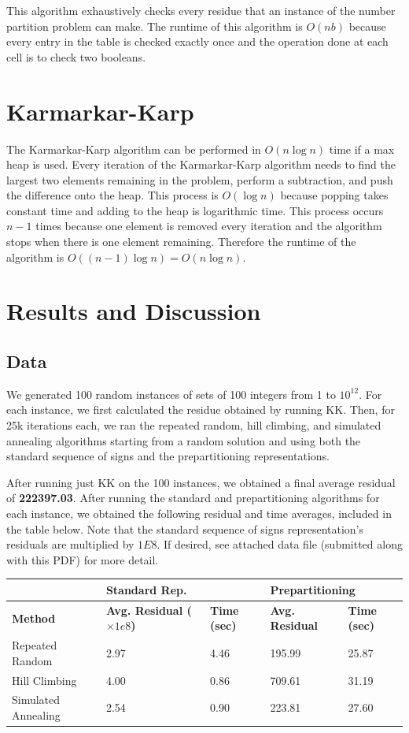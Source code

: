 \documentclass[a4paper]{article}
\begin{document}
	This algorithm exhaustively checks every residue that an instance of the number partition problem can make. The runtime of this algorithm is $O(nb)$ because every entry in the table is checked exactly once and the operation done at each cell is to check two booleans.
	
	\section{Karmarkar-Karp}
	The Karmarkar-Karp algorithm can be performed in $O(n\log n)$ time if a max heap is used. Every iteration of the Karmarkar-Karp algorithm needs to find the largest two elements remaining in the problem, perform a subtraction, and push the difference onto the heap. This process is $O(\log n)$ because popping takes constant time and adding to the heap is logarithmic time. This process occurs $n-1$ times because one element is removed every iteration and the algorithm stops when there is one element remaining. Therefore the runtime of the algorithm is $O((n-1) \log n) = O(n\log n)$.
	
	\section{Results and Discussion}
	\subsection{Data}
	We generated 100 random instances of sets of 100 integers from 1 to $10^{12}$. For each instance, we first calculated the residue obtained by running KK. Then, for 25k iterations each, we ran the repeated random, hill climbing, and simulated annealing algorithms starting from a random solution and using both the standard sequence of signs and the prepartitioning representations. 
	
	After running just KK on the 100 instances, we obtained a final average residual of \textbf{222397.03}. After running the standard and prepartitioning algorithms for each instance, we obtained the following residual and time averages, included in the table below. Note that the standard sequence of signs representation's residuals are multiplied by $1E8$. If desired, see attached data file (submitted along with this PDF) for more detail. 
	
\begin{tabular}{l|ll|ll}
\textbf{}           & \multicolumn{2}{l|}{\textbf{Standard Rep.}}               & \multicolumn{2}{l|}{\textbf{Prepartitioning}} \\ \hline
\textbf{Method}     & \textbf{Avg. Residual ($\times 1e8$)} & \textbf{Time (sec)} & \textbf{Avg. Residual}  & \textbf{Time (sec)} \\ \hline
Repeated Random     & 2.97                                & 4.46                & 195.99                  & 25.87               \\
Hill Climbing       & 4.00                                & 0.86                & 709.61                  & 31.19               \\
Simulated Annealing & 2.54                                & 0.90                & 223.81                  & 27.60              
\end{tabular}
	
\end{document}
